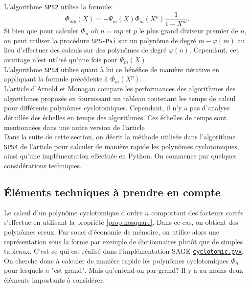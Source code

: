 \documentclass{article}
\theoremstyle{break}                  %
\begin{document}
L'algorithme \texttt{SPS2} utilise la formule:
$$\Phi_{mp}(X) = - \Psi_m(X) \Phi_m(X^p) \frac{1}{1 - X^m}.$$ Si bien que pour calculer $\Phi_{n}$ où $n = mp$ et $p$ le plus grand diviseur premier de $n$, on peut utiliser la procédure \texttt{SPS-Psi} sur un polynôme de degré $m - \varphi(m)$ au lieu d'effectuer des calculs sur des polynômes de degré $\varphi(n)$. Cependant, cet avantage n'est utilisé qu'une fois pour $\Psi_m(X)$.\\

L'algorithme \texttt{SPS3} utilise quant à lui ce bénéfice de manière itérative en appliquant la formule précédente à $\Phi_m(X^p)$.\\

L'article d'Arnold et Monagan compare les performances des algorithmes des algorithmes proposés en fournissant un tableau contenant les temps de calcul pour différents polynômes cyclotomiques. Cependant, il n'y a pas d'analyse détaillée des échelles en temps des algorithmes. Ces échelles de temps sont mentionnées dans une autre version de l'article \cite{monagan+}.\\

Dans la suite de cette section, on décrit la méthode utilisée dans l'algorithme \texttt{SPS4} de l'article pour calculer de manière rapide les polynômes cyclotomiques, ainsi qu'une implémentation effectuée en Python. On commence par quelques considérations techniques.

\subsection*{Éléments techniques à prendre en compte}

Le calcul d'un polynôme cyclotomique d'ordre $n$ comportant des facteurs carrés s'effectue en utilisant la propriété \ref{prop:nosquare}. Dans ce cas, on obtient des polynômes creux. Par souci d'économie de mémoire, on utilise alors une représentation sous la forme par exemple de dictionnaires plutôt que de simples tableaux. C'est ce qui est réalisé dans l'implémentation  
SAGE \href{https://github.com/sagemath/sage/blob/develop/src/sage/rings/polynomial/cyclotomic.pyx}{\texttt{cyclotomic.pyx}}.\\

On cherche donc à calculer de manière rapide les polynômes cyclotomiques $\Phi_n$ pour lesquels $n$ "est grand". Mais qu'entend-on par grand? Il y a au moins deux éléments importants à considérer.\\
\end{document}
